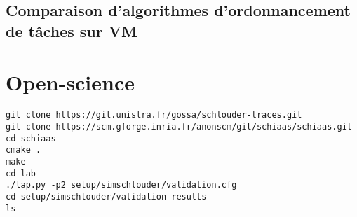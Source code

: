 \documentclass[parallelisme]{compas2017}
\begin{document}
\subsection{Comparaison d'algorithmes d'ordonnancement de tâches sur VM}

\section{Open-science}

\begin{verbatim}
git clone https://git.unistra.fr/gossa/schlouder-traces.git
git clone https://scm.gforge.inria.fr/anonscm/git/schiaas/schiaas.git 
cd schiaas
cmake .
make
cd lab
./lap.py -p2 setup/simschlouder/validation.cfg
cd setup/simschlouder/validation-results
ls
\end{verbatim}



\end{document}
